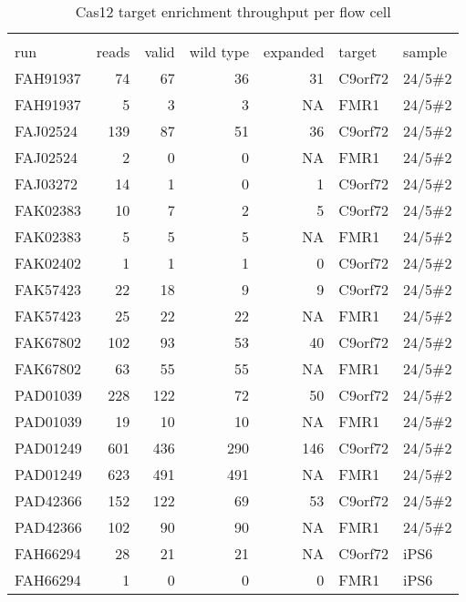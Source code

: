 \setlength\LTleft{0pt}
\setlength\LTright{0pt}
\begin{longtable}{lrrrrll}
\caption[Cas12 target enrichment throughput per flow cell]{Cas12 target enrichment throughput per flow cell} \\
\label{tab:strique:Cas12} \\
run      & reads & valid & wild type & expanded & target  & sample  \\
\hline
FAH91937 & 74    & 67    & 36        & 31       & C9orf72 & 24/5\#2 \\
FAH91937 & 5     & 3     & 3         & NA       & FMR1    & 24/5\#2 \\
FAJ02524 & 139   & 87    & 51        & 36       & C9orf72 & 24/5\#2 \\
FAJ02524 & 2     & 0     & 0         & NA       & FMR1    & 24/5\#2 \\
FAJ03272 & 14    & 1     & 0         & 1        & C9orf72 & 24/5\#2 \\
FAK02383 & 10    & 7     & 2         & 5        & C9orf72 & 24/5\#2 \\
FAK02383 & 5     & 5     & 5         & NA       & FMR1    & 24/5\#2 \\
FAK02402 & 1     & 1     & 1         & 0        & C9orf72 & 24/5\#2 \\
FAK57423 & 22    & 18    & 9         & 9        & C9orf72 & 24/5\#2 \\
FAK57423 & 25    & 22    & 22        & NA       & FMR1    & 24/5\#2 \\
FAK67802 & 102   & 93    & 53        & 40       & C9orf72 & 24/5\#2 \\
FAK67802 & 63    & 55    & 55        & NA       & FMR1    & 24/5\#2 \\
PAD01039 & 228   & 122   & 72        & 50       & C9orf72 & 24/5\#2 \\
PAD01039 & 19    & 10    & 10        & NA       & FMR1    & 24/5\#2 \\
PAD01249 & 601   & 436   & 290       & 146      & C9orf72 & 24/5\#2 \\
PAD01249 & 623   & 491   & 491       & NA       & FMR1    & 24/5\#2 \\
PAD42366 & 152   & 122   & 69        & 53       & C9orf72 & 24/5\#2 \\
PAD42366 & 102   & 90    & 90        & NA       & FMR1    & 24/5\#2 \\
FAH66294 & 28    & 21    & 21        & NA       & C9orf72 & iPS6    \\
FAH66294 & 1     & 0     & 0         & 0        & FMR1    & iPS6    \\

\end{longtable}
